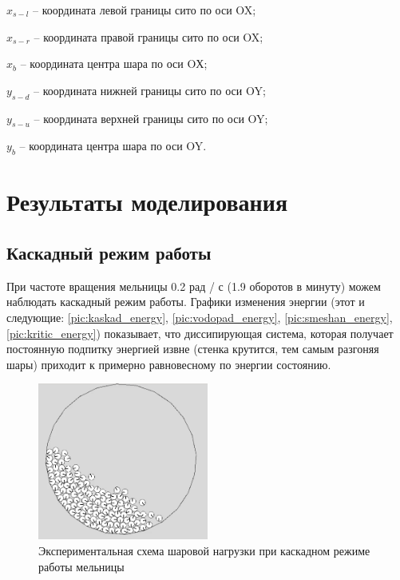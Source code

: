 \documentclass[utf8x, 14pt, oneside, a4paper]{article}
\begin{document}
$x_{s-l}$ -- координата левой границы сито по оси OX;

$x_{s-r}$ -- координата правой границы сито по оси OX;

$x_b$ -- координата центра шара по оси OХ;

$y_{s-d}$ -- координата нижней границы сито по оси OY;

$y_{s-u}$ -- координата верхней границы сито по оси OY;

$y_b$ -- координата центра шара по оси OY.




\pagebreak

\section{Результаты моделирования}

\subsection{Каскадный режим работы}

При частоте вращения мельницы 0.2 рад / с (1.9 оборотов в минуту) можем наблюдать каскадный режим работы.
Графики изменения энергии (этот и следующие: \ref{pic:kaskad_energy}, \ref{pic:vodopad_energy}, \ref{pic:smeshan_energy}, \ref{pic:kritic_energy}) показывает, что диссипирующая система, которая получает постоянную подпитку энергией извне (стенка крутится, тем самым разгоняя шары) приходит к примерно равновесному по энергии состоянию.

\begin{figure}[H]
	\centering
	\includegraphics[width=0.5\textwidth]{kaskad_result} 
	\caption{Экспериментальная схема шаровой нагрузки при каскадном режиме работы мельницы}
	\label{pic:kaskad_result}
\end{figure} 
\end{document}
